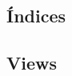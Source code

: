 \documentclass[12pt,a4paper,titlepage]{article}
\begin{document}
\clearpage\subsection{Índices}

\subsection{Views}
\end{document}
